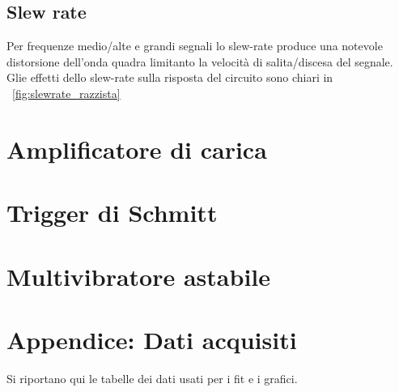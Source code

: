 \documentclass[10pt,a4paper]{article}
\begin{document}
\subsection{Slew rate}
Per frequenze medio/alte e grandi segnali lo slew-rate produce una notevole distorsione dell'onda quadra limitanto la velocità di salita/discesa del segnale. Glie effetti dello slew-rate sulla risposta del circuito sono chiari in \figurename{~\ref{fig:slewrate_razzista}}


\section{Amplificatore di carica}


\section{Trigger di Schmitt}

\section{Multivibratore astabile}

\pagebreak
\section{Appendice: Dati acquisiti}
Si riportano qui le tabelle dei dati usati per i fit e i grafici.



\end{document}
